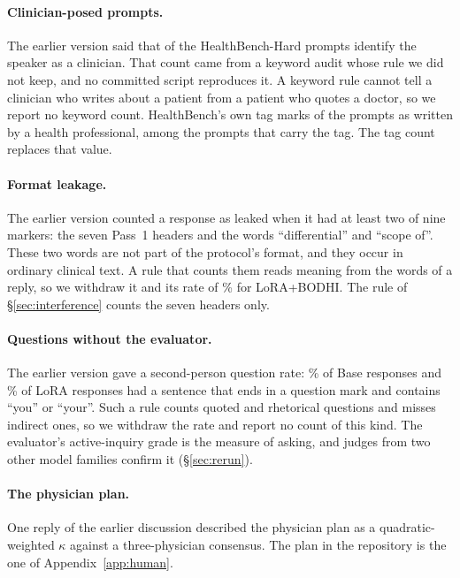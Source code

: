 \documentclass{article}
\newcommand{\bodhi}{BODHI}
\newcommand{\hbhard}{HealthBench-Hard}
\begin{document}
\paragraph{Clinician-posed prompts.} The earlier version said that \statPostedClinicianPrompts{} of
the \statHBMedGemmaMayPopulationPrompts{} \hbhard{} prompts identify the speaker as a clinician. That count came from
a keyword audit whose rule we did not keep, and no committed script reproduces it. A keyword rule
cannot tell a clinician who writes about a patient from a patient who quotes a doctor, so we report
no keyword count. HealthBench's own tag marks
\statHBMedGemmaMayLabelClinicianUserPopPos{} of the \statHBMedGemmaMayPopulationPrompts{} prompts as written by a health
professional, among the \statHBMedGemmaMayLabelClinicianUserPopLabelled{} prompts that carry the tag. The tag count
replaces that value.

\paragraph{Format leakage.} The earlier version counted a response as leaked when
it had at least two of nine markers: the seven Pass~1 headers and the words ``differential'' and
``scope of''. These two words are not part of the protocol's format, and they occur in ordinary
clinical text. A rule that counts them reads meaning from the words of a reply, so we withdraw it
and its rate of \statPostedLeakagePctLoRABodhi\% for LoRA+\bodhi{}. The rule of
\S\ref{sec:interference} counts the seven headers only.

\paragraph{Questions without the evaluator.} The earlier version gave a second-person question rate:
\statPostedSecondPersonBase\% of Base responses and \statPostedSecondPersonLoRA\% of LoRA
responses had a sentence that ends in a question mark and contains ``you'' or ``your''. Such a rule
counts quoted and rhetorical questions and misses indirect ones, so we withdraw the rate and report
no count of this kind. The evaluator's active-inquiry grade is the measure of asking, and judges
from two other model families confirm it (\S\ref{sec:rerun}).

\paragraph{The physician plan.} One reply of the earlier discussion described the physician plan
as a quadratic-weighted $\kappa$ against a three-physician consensus. The plan in the repository
is the one of Appendix~\ref{app:human}.
\end{document}
